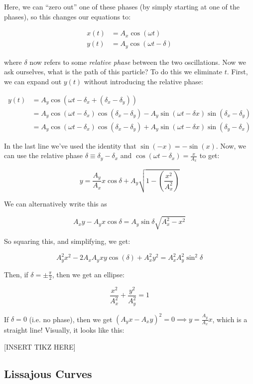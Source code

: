 Here, we can ``zero out'' one of these phases (by simply starting at one of the phases), so this changes our equations to: 

\begin{align*}
    x(t) &= A_x \cos (\omega t)\\
    y(t) &= A_y \cos (\omega t - \delta) 
\end{align*}


where $\delta$ now refers to some \textit{relative phase} between the two oscillations. Now we ask ourselves, what is the path of this particle? To do this we eliminate $t$. First, we can expand out $y(t)$ without introducing the relative phase: 

\begin{align*}
    y(t) &= A_y \cos (\omega t - \delta_x + (\delta_x - \delta_y))\\
    &= A_y \cos (\omega t - \delta_x)\cos(\delta_x - \delta_y) - A_y \sin (\omega t - \delta x)\sin (\delta_x - \delta_y)\\
    &= A_y \cos (\omega t - \delta_x) \cos (\delta_x - \delta_y) + A_y \sin (\omega t - \delta x) \sin (\delta_y - \delta_x)
\end{align*}

In the last line we've used the identity that $\sin (-x) = -\sin(x)$. Now, we can use the relative phase $\delta \equiv \delta_y - \delta_x$ and $\cos(\omega t - \delta_x) = \frac{x}{A_x}$ to get: 

\[ y = \frac{A_y}{A_x} x \cos \delta + A_y  \sqrt{1 - \left( \frac{x^2}{A_x^2}\right)}\]

We can alternatively write this as

\[ A_xy - A_yx \cos \delta = A_y \sin \delta \sqrt{A_x^2 - x^2}\] 

So squaring this, and simplifying, we get: 

\[ A_y^2x^2 - 2A_xA_y xy \cos (\delta) + A_x^2y^2 = A_x^2A_y^2 \sin^2 \delta\]

Then, if $\delta = \pm \frac{\pi}{2}$, then we get an ellipse: 

\[ \frac{x^2}{A_x^2} + \frac{y^2}{A_y^2} = 1\] 

If $\delta = 0$ (i.e. no phase), then we get $(A_yx - A_xy)^2 = 0 \implies y = \frac{A_y}{A_x}x$, which is a straight line! Visually, it looks like this: 

[INSERT TIKZ HERE]

\subsection{Lissajous Curves}

